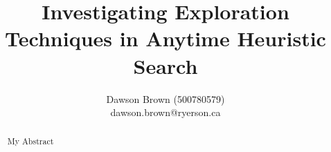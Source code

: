 \documentclass[letterpaper]{article}
\title{Investigating Exploration Techniques in Anytime Heuristic Search}
\author{Dawson Brown (500780579)\\dawson.brown@ryerson.ca}
\date{}
\begin{document}
\maketitle
\pagestyle{plain}

\begin{abstract}
    My Abstract
\end{abstract}














\newpage

% 
\end{document}
